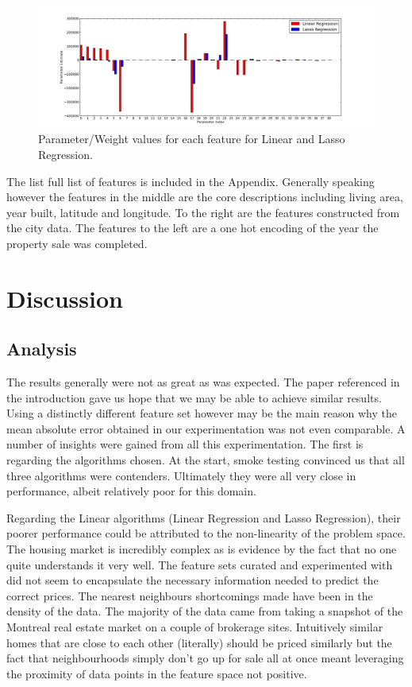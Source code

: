 \documentclass{acm_proc_article-sp}
\begin{document}
	 \begin{figure}[!htbp]
   		\centering
  		\includegraphics[width=\textwidth]{parameter_values.png}
    		\caption{Parameter/Weight values for each feature for Linear and Lasso Regression.}
    		\label{fig:feats}
	\end{figure}
	
	The list full list of features is included in the Appendix. Generally speaking however the features in the middle are the core descriptions including living area, year built, latitude and longitude. To the right are the features constructed from the city data. The features to the left are a one hot encoding of the year the property sale was completed.

\section{Discussion}

\subsection{Analysis}
	The results generally were not as great as was expected. The paper referenced in the introduction \cite{bostonres} gave us hope that we may be able to achieve similar results. Using a distinctly different feature set however may be the main reason why the mean absolute error obtained in our experimentation was not even comparable. A number of insights were gained from all this experimentation. The first is regarding the algorithms chosen. At the start, smoke testing convinced us that all three algorithms were contenders. Ultimately they were all very close in performance, albeit relatively poor for this domain. 
	
	Regarding the Linear algorithms (Linear Regression and Lasso Regression), their poorer performance could be attributed to the non-linearity of the problem space. The housing market is incredibly complex as is evidence by the fact that no one quite understands it very well. The feature sets curated and experimented with did not seem to encapsulate the necessary information needed to predict the correct prices. The nearest neighbours shortcomings made have been in the density of the data. The majority of the data came from taking a snapshot of the Montreal real estate market on a couple of brokerage sites. Intuitively similar homes that are close to each other (literally) should be priced similarly but the fact that neighbourhoods simply don't go up for sale all at once meant leveraging the proximity of data points in the feature space not positive.
	
\end{document}
